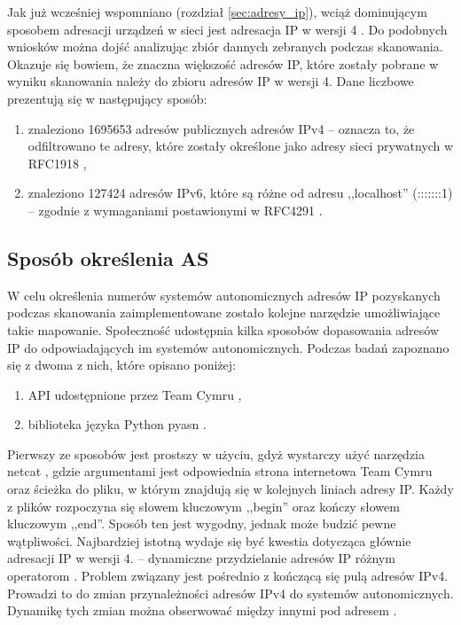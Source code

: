 Jak już wcześniej wspomniano (rozdział \ref{sec:adresy_ip}), wciąż dominującym sposobem adresacji urządzeń w sieci jest adresacja
IP w wersji 4 \cite{Ipv6_deployment}.
Do podobnych wniosków można dojść analizując zbiór dannych zebranych podczas skanowania. Okazuje się bowiem, że znaczna większość
adresów IP, które zostały pobrane w wyniku skanowania należy do zbioru adresów IP w wersji 4. Dane liczbowe prezentują się w
następujący sposób:
\begin{enumerate}
	\item znaleziono 1695653 adresów publicznych adresów IPv4 -- oznacza to, że odfiltrowano te adresy, które zostały określone
	jako adresy sieci prywatnych w RFC1918 \cite{RFC1918},
	\item znaleziono 127424 adresów IPv6, które są różne od adresu ,,localhost'' (:::::::1) -- zgodnie z wymaganiami postawionymi
	w RFC4291 \cite{RFC4291}.
\end{enumerate}

\subsection{Sposób określenia AS}
\noindent W celu określenia numerów systemów autonomicznych adresów IP pozyskanych podczas skanowania zaimplementowane zostało kolejne
narzędzie umożliwiające takie mapowanie. Społeczność udostępnia kilka sposobów dopasowania adresów IP do odpowiadających im
systemów autonomicznych. Podczas badań zapoznano się z dwoma z nich, które opisano poniżej:
\begin{enumerate}
	\item API udostępnione przez Team Cymru \cite{cymru},
	\item biblioteka języka Python pyasn \cite{pyasn}.
\end{enumerate}

Pierwszy ze sposobów jest prostszy w użyciu, gdyż wystarczy użyć narzędzia netcat \cite{netcat}, gdzie argumentami jest odpowiednia
strona internetowa Team Cymru \cite{cymru} oraz ścieżka do pliku, w którym znajdują się w kolejnych liniach adresy IP. Każdy z plików
rozpoczyna się słowem kluczowym ,,begin'' oraz kończy słowem kluczowym ,,end''. Sposób ten jest wygodny, jednak może budzić pewne
wątpliwości. Najbardziej istotną wydaje się być kwestia dotycząca głównie adresacji IP w wersji 4. -- dynamiczne przydzielanie adresów
IP różnym operatorom \cite{RFC2050}. Problem związany jest pośrednio z kończącą się pulą adresów IPv4. Prowadzi to do zmian przynależności
adresów IPv4 do systemów autonomicznych. Dynamikę tych zmian można obserwować między innymi pod adresem \cite{cidr_report}.

